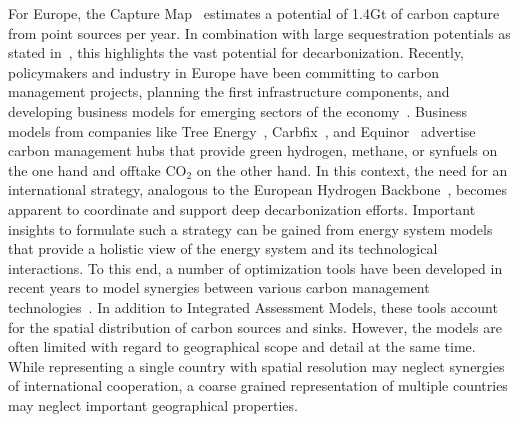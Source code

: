 \documentclass[conference]{IEEEtran}
\newcommand{\carbon}{CO$_2$ }
\begin{document}
For Europe, the Capture Map~\cite{ToolsGreenTransition} estimates a potential of 1.4Gt of carbon capture from point sources per year. In combination with large sequestration potentials as stated in~\cite{weiProposedGlobalLayout2021}, this highlights the vast potential for decarbonization. Recently, policymakers and industry in Europe have been committing to carbon management projects, planning the first infrastructure components, and developing business models for emerging sectors of the economy~\cite{adomaitisEquinorRWEBuild2023,apnewswireGermanyDrawLegislation2023,KohlenstoffKannKlimaschutz2023,OGETESJoin2022,TESHydrogenLife2023}. Business models from companies like Tree Energy~\cite{TESHydrogenLife2023}, Carbfix~\cite{WeTurnCO2}, and Equinor~\cite{adomaitisEquinorRWEBuild2023} advertise carbon management hubs that provide green hydrogen, methane, or synfuels on the one hand and offtake \carbon on the other hand. In this context, the need for an international strategy, analogous to the European Hydrogen Backbone~\cite{gasforclimateEuropeanHydrogenBackbone2022}, becomes apparent to coordinate and support deep decarbonization efforts. Important insights to formulate such a strategy can be gained from energy system models that provide a holistic view of the energy system and its technological interactions. To this end, a number of optimization tools have been developed in recent years to model synergies between various carbon management technologies~\cite{bakkenLinearModelsOptimization2008,morbeeOptimisedDeploymentEuropean2012,oeiModelingCarbonCapture2014,elahiMultiperiodLeastCost2014,burandtDecarbonizingChinaEnergy2019,middletonSimCCSOpensourceTool2020,bjerketvedtOptimalDesignCost2020,weiProposedGlobalLayout2021,damoreOptimalDesignEuropean2021,becattiniCarbonDioxideCapture2022}. In addition to Integrated Assessment Models, these tools account for the spatial distribution of carbon sources and sinks.
However, the models are often limited with regard to geographical scope and detail at the same time. While representing a single country with spatial resolution may neglect synergies of international cooperation, a coarse grained representation of multiple countries may neglect important geographical properties.
\end{document}
